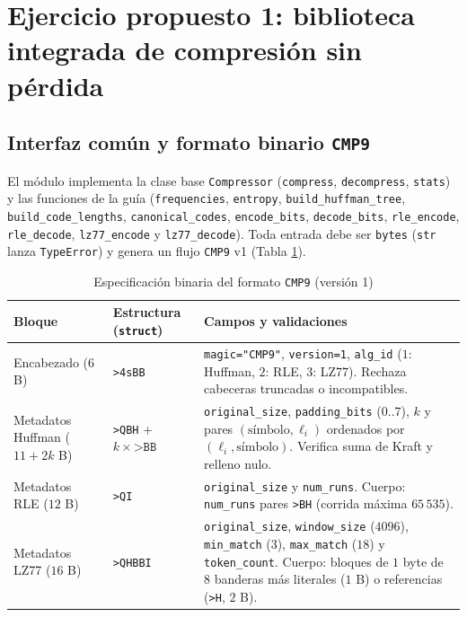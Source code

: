 \section{Ejercicio propuesto 1: biblioteca integrada de compresión sin pérdida}

\subsection{Interfaz común y formato binario \texttt{CMP9}}
El módulo  implementa la clase base \texttt{Compressor} (\texttt{compress}, \texttt{decompress}, \texttt{stats}) y las funciones de la guía (\texttt{frequencies}, \texttt{entropy}, \texttt{build\_huffman\_tree}, \texttt{build\_code\_lengths}, \texttt{canonical\_codes}, \texttt{encode\_bits}, \texttt{decode\_bits}, \texttt{rle\_encode}, \texttt{rle\_decode}, \texttt{lz77\_encode} y \texttt{lz77\_decode}). Toda entrada debe ser \texttt{bytes} (\texttt{str} lanza \texttt{TypeError}) y genera un flujo \texttt{CMP9} v1 (Tabla \ref{tab:formato_cmp9}).

\begin{table}[H]\centering\footnotesize
\setlength{\tabcolsep}{4pt}
\caption{Especificación binaria del formato \texttt{CMP9} (versión 1)}\label{tab:formato_cmp9}
\begin{tabularx}{\textwidth}{@{}p{}p{}>{\raggedright\arraybackslash}X@{}}\toprule
Bloque & Estructura (\texttt{struct}) & Campos y validaciones \\ \midrule
Encabezado ($6$ B) & \texttt{>4sBB} & \texttt{magic="CMP9"}, \texttt{version=1}, \texttt{alg\_id} ($1$: Huffman, $2$: RLE, $3$: LZ77). Rechaza cabeceras truncadas o incompatibles. \\
Metadatos Huffman ($11+2k$ B) & \texttt{>QBH} + $k\times\texttt{>BB}$ & \texttt{original\_size}, \texttt{padding\_bits} ($0..7$), $k$ y pares $(\text{símbolo}, \ell_i)$ ordenados por $(\ell_i,\text{símbolo})$. Verifica suma de Kraft y relleno nulo. \\
Metadatos RLE ($12$ B) & \texttt{>QI} & \texttt{original\_size} y \texttt{num\_runs}. Cuerpo: \texttt{num\_runs} pares \texttt{>BH} (corrida máxima $65\,535$). \\
Metadatos LZ77 ($16$ B) & \texttt{>QHBBI} & \texttt{original\_size}, \texttt{window\_size} ($4096$), \texttt{min\_match} ($3$), \texttt{max\_match} ($18$) y \texttt{token\_count}. Cuerpo: bloques de $1$ byte de $8$ banderas más literales ($1$ B) o referencias (\texttt{>H}, $2$ B). \\ \bottomrule
\end{tabularx}\end{table}

